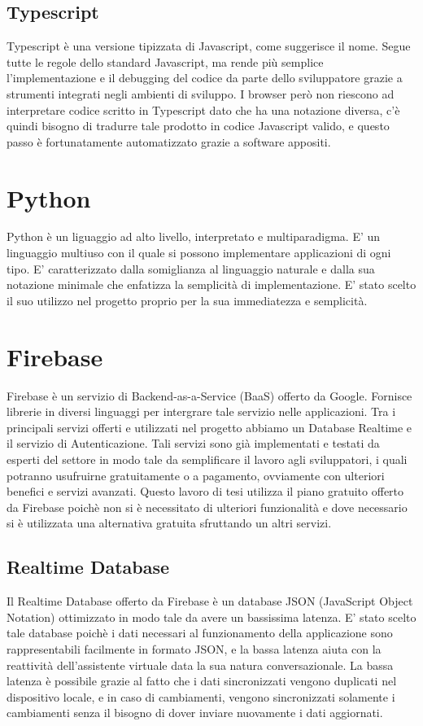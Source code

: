 \subsection{Typescript}
Typescript è una versione tipizzata di Javascript, come suggerisce il nome.
Segue tutte le regole dello standard Javascript, ma rende più semplice l'implementazione e il debugging del codice da parte dello sviluppatore grazie a strumenti integrati negli ambienti di sviluppo.
I browser però non riescono ad interpretare codice scritto in Typescript dato che ha una notazione diversa, c'è quindi bisogno di tradurre tale prodotto in codice Javascript valido, e questo passo è fortunatamente automatizzato grazie a software appositi.

\section{Python}
Python è un liguaggio ad alto livello, interpretato e multiparadigma.
E' un linguaggio multiuso con il quale si possono implementare applicazioni di ogni tipo.
E' caratterizzato dalla somiglianza al linguaggio naturale e dalla sua notazione minimale che enfatizza la semplicità di implementazione.
E' stato scelto il suo utilizzo nel progetto proprio per la sua immediatezza e semplicità.

\section{Firebase}
Firebase è un servizio di Backend-as-a-Service (BaaS) offerto da Google.
Fornisce librerie in diversi linguaggi per intergrare tale servizio nelle applicazioni.
Tra i principali servizi offerti e utilizzati nel progetto abbiamo un Database Realtime e il servizio di Autenticazione.
Tali servizi sono già implementati e testati da esperti del settore in modo tale da semplificare il lavoro agli sviluppatori, i quali potranno usufruirne gratuitamente o a pagamento, ovviamente con ulteriori benefici e servizi avanzati.
Questo lavoro di tesi utilizza il piano gratuito offerto da Firebase poichè non si è necessitato di ulteriori funzionalità e dove necessario si è utilizzata una alternativa gratuita sfruttando un altri servizi.

\subsection{Realtime Database}
Il Realtime Database offerto da Firebase è un database JSON (JavaScript Object Notation) ottimizzato in modo tale da avere un bassissima latenza.
E' stato scelto tale database poichè i dati necessari al funzionamento della applicazione sono rappresentabili facilmente in formato JSON, e la bassa latenza aiuta con la reattività dell'assistente virtuale data la sua natura conversazionale. 
La bassa latenza è possibile grazie al fatto che i dati sincronizzati vengono duplicati nel dispositivo locale, e in caso di cambiamenti, vengono sincronizzati solamente i cambiamenti senza il bisogno di dover inviare nuovamente i dati aggiornati.

